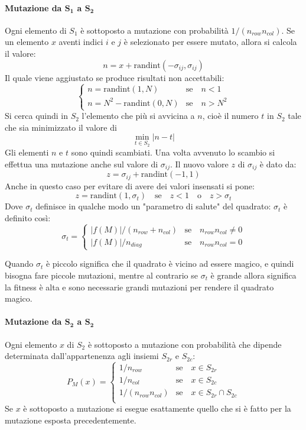 \documentclass[italian,twoside,twocolumn]{article}
\begin{document}
\paragraph{Mutazione da $ \mathbf{S_1} $ a $ \mathbf{S_2} $}
Ogni elemento di $ S_1 $ è sottoposto a mutazione con probabilità $ 1\slash(n_{row}n_{col}) $. Se un elemento $ x $ aventi indici $ i $ e $ j $ è selezionato per essere mutato, allora si calcola il valore:
\[ n = 	x + \text{randint}(-\sigma_{ij}, \sigma_{ij})  \]
Il quale viene aggiustato se produce risultati non accettabili:
\[
\begin{cases}
n = \text{randint}(1,N) & \text{se} \quad n < 1  \\
n = N^2 - \text{randint}(0,N) & \text{se} \quad n > N^2  
\end{cases}
\]
Si cerca quindi in $ S_2 $ l'elemento che più si avvicina a $ n $, cioè il numero $ t $ in $ S_2 $ tale che sia minimizzato il valore di 
\[\min_{t \in S_2} \lvert n - t \rvert \]
Gli elementi $ n $ e $ t $ sono quindi scambiati. Una volta avvenuto lo scambio si effettua una mutazione anche sul valore di $ \sigma_{ij} $.
Il nuovo valore $ z $ di $ \sigma_{ij} $ è dato da: 
\[ z = 	\sigma_{ij} + \text{randint}(-1, 1)  \]
Anche in questo caso per evitare di avere dei valori insensati si pone:
\[
z = \text{randint}(1,\sigma_t) \quad \text{se} \quad z < 1 \quad \text{o} \quad  z > \sigma_t 
\]
Dove $ \sigma_t $ definisce in qualche modo un "parametro di salute" del quadrato: 
$ \sigma_t $ è definito così:
\[ \sigma_t = 
\begin{cases}
\lvert f(M) \rvert \slash \left(n_{row} + n_{col}\right) & \text{se} \quad n_{row}n_{col} \not = 0  \\
\lvert f(M) \rvert \slash n_{diag} & \text{se} \quad n_{row}n_{col} = 0 
\end{cases}
\]

Quando $ \sigma_t $ è piccolo significa che il quadrato è vicino ad essere magico, e quindi bisogna fare piccole mutazioni, mentre al contrario se $ \sigma_t $ è grande allora significa la fitness è alta e sono necessarie grandi mutazioni per rendere il quadrato magico.

\paragraph{Mutazione da $ \mathbf{S_2} $ a $ \mathbf{S_2} $}
Ogni elemento $ x $ di $ S_2 $ è sottoposto a mutazione con probabilità che dipende determinata dall'appartenenza agli insiemi $ S_{2r} $ e $ S_{2c} $:
\[ P_M(x) = 
\begin{cases}
1\slash n_{row} & \text{se} \quad x \in S_{2r} \\
1\slash n_{col} & \text{se} \quad x \in S_{2c} \\
1\slash \left(n_{row} n_{col} \right) & \text{se} \quad x \in S_{2r} \cap S_{2c} \\
\end{cases}
\]
Se $ x $ è sottoposto a mutazione si esegue esattamente quello che si è fatto per la mutazione esposta precedentemente. 
\end{document}

